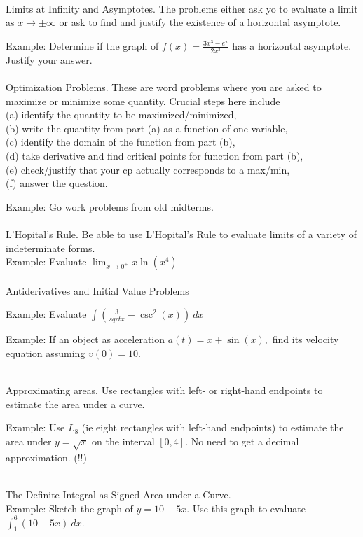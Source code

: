 \documentclass[11pt,fleqn]{article}
\begin{document}
\noindent {}\\
Limits at Infinity and Asymptotes. The problems either ask yo to evaluate a limit as $x \to \pm \infty$ or ask to find and justify the existence of a  horizontal asymptote.

Example: Determine if the graph of $f(x)=\frac{3x^3-e^x}{2x^3}$ has a horizontal asymptote. Justify your answer.\\

\noindent {}\\
Optimization Problems. These are word problems where you are asked to maximize or minimize some quantity. Crucial steps here include\\
 (a) identify the quantity to be maximized/minimized, \\
 (b) write the quantity from part (a) as a function of one variable,\\
 (c) identify the domain of the function from part (b), \\
 (d) take derivative and find critical points for function from part (b), \\
 (e) check/justify that your cp actually corresponds to a max/min,\\
 (f) answer the question.
 
 Example: Go work problems from old midterms.\\ 

\noindent {}\\
L'Hopital's Rule. Be able to use L'Hopital's Rule to evaluate limits of a variety of indeterminate forms.\\

Example: Evaluate $\lim_{x \to 0^+} x \ln(x^4)$\\

\noindent {}\\
Antiderivatives and Initial Value Problems 

Example: Evaluate $\int (\frac{3}{sqrt{x}}-\csc^2(x)) \: dx$

Example: If an object as acceleration $a(t) = x + \sin(x),$ find its velocity equation assuming $v(0)=10.$


\noindent {}\\
Approximating areas. Use rectangles with left- or right-hand endpoints to estimate the area under a curve. 

Example: Use $L_8$ (ie eight rectangles with left-hand endpoints) to estimate the area under $y=\sqrt{x}$ on the interval $[0,4].$ No need to get a decimal approximation. (!!)


\noindent {}\\
The Definite Integral as Signed Area under a Curve.\\

Example: Sketch the graph of $y=10 - 5x.$ Use this graph to evaluate $\int_{1}^6 (10-5x) \:dx$.
\end{document}
